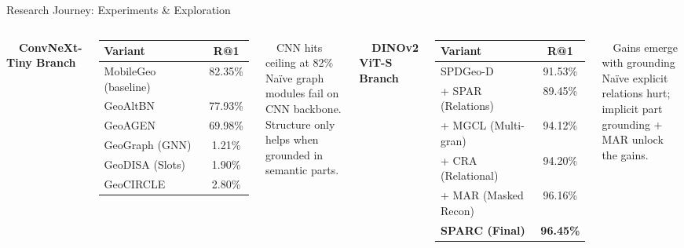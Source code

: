 \documentclass[aspectratio=169, 11pt]{beamer}
\begin{document}
\begin{frame}{Research Journey: Experiments \& Exploration}
\begin{columns}[T]
\vspace{0.1cm}
{\large \textbf{\faFlask\ \ ConvNeXt-Tiny Branch}}
\vspace{0.1cm}
\footnotesize
\begin{tabular}{@{}lc@{}}
  \toprule
  \textbf{Variant} & \textbf{R@1} \\
  \midrule
  MobileGeo (baseline) & 82.35\% \\
  GeoAltBN & 77.93\% \\
  GeoAGEN & 69.98\% \\
  \rowcolor{dangerred!10} GeoGraph (GNN) & 1.21\% \\
  \rowcolor{dangerred!10} GeoDISA (Slots) & 1.90\% \\
  \rowcolor{dangerred!10} GeoCIRCLE & 2.80\% \\
  \bottomrule
\end{tabular}

\vspace{0.2cm}
\begin{alertblock}{\footnotesize \faTimesCircle\ \ CNN hits ceiling at 82\%}
  Na\"ive graph modules fail on CNN backbone.\\
  Structure only helps when grounded in semantic parts.
\end{alertblock}

\vspace{0.1cm}
{\large \textbf{\faRocket\ \ DINOv2 ViT-S Branch}}
\vspace{0.1cm}
\footnotesize
\begin{tabular}{@{}lc@{}}
  \toprule
  \textbf{Variant} & \textbf{R@1} \\
  \midrule
  SPDGeo-D & 91.53\% \\
  + SPAR (Relations) & 89.45\% \\
  + MGCL (Multi-gran) & 94.12\% \\
  + CRA (Relational) & 94.20\% \\
  + MAR (Masked Recon) & 96.16\% \\
  \rowcolor{successgreen!20} \textbf{SPARC (Final)} & \textbf{96.45\%} \\
  \bottomrule
\end{tabular}

\vspace{0.2cm}
\begin{exampleblock}{\footnotesize \faCheckCircle\ \ Gains emerge with grounding}
  Na\"ive explicit relations hurt; implicit part\\grounding + MAR unlock the gains.
\end{exampleblock}
\end{columns}
\end{frame}
\end{document}
